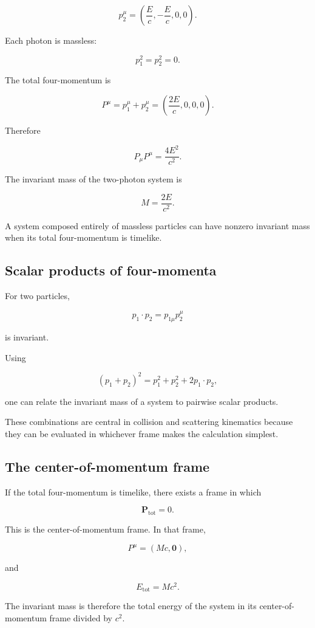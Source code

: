 \[
p_{2}^{\mu}
=
\left(
\frac{E}{c},
-\frac{E}{c},0,0
\right).
\]

Each photon is massless:

\[
p_{1}^{2}=p_{2}^{2}=0.
\]

The total four-momentum is

\[
P^{\mu}
=
p_{1}^{\mu}+p_{2}^{\mu}
=
\left(
\frac{2E}{c},0,0,0
\right).
\]

Therefore

\[
P_{\mu}P^{\mu}
=
\frac{4E^{2}}{c^{2}}.
\]

The invariant mass of the two-photon system is

\[
\boxed{
M
=
\frac{2E}{c^{2}}
}.
\]

A system composed entirely of massless particles can have nonzero invariant mass when its total four-momentum is timelike.

\subsection{Scalar products of four-momenta}

For two particles,

\[
p_{1}\cdot p_{2}
=
p_{1\mu}p_{2}^{\mu}
\]

is invariant.

Using

\[
(p_{1}+p_{2})^{2}
=
p_{1}^{2}+p_{2}^{2}+2p_{1}\cdot p_{2},
\]

one can relate the invariant mass of a system to pairwise scalar products.

These combinations are central in collision and scattering kinematics because they can be evaluated in whichever frame makes the calculation simplest.

\subsection{The center-of-momentum frame}

If the total four-momentum is timelike, there exists a frame in which

\[
\mathbf{P}_{\mathrm{tot}}=0.
\]

This is the center-of-momentum frame. In that frame,

\[
P^{\mu}
=
(Mc,\mathbf{0}),
\]

and

\[
E_{\mathrm{tot}}=Mc^{2}.
\]

The invariant mass is therefore the total energy of the system in its center-of-momentum frame divided by \(c^{2}\).

